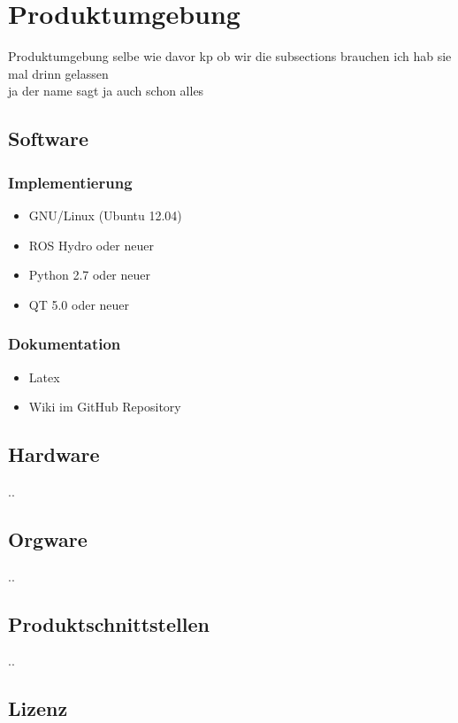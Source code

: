 \chapter{Produktumgebung}
Produktumgebung selbe wie davor kp ob wir die subsections brauchen ich hab sie
mal drinn gelassen\\

ja der name sagt ja auch schon alles

\section{Software}
\subsection{Implementierung}
\begin{itemize}
  \item GNU/Linux (Ubuntu 12.04)
  \item ROS Hydro oder neuer
  \item Python 2.7 oder neuer
  \item QT 5.0 oder neuer
\end{itemize}

\subsection{Dokumentation}
\begin{itemize}
  \item Latex
  \item Wiki im GitHub Repository
\end{itemize}

\section{Hardware}
..
\section{Orgware}
..
\section{Produktschnittstellen}
..

\section{Lizenz}